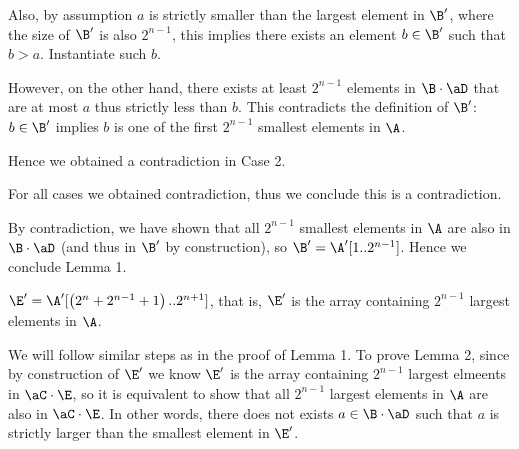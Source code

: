 \documentclass[11pt, sakura, night, 1in]{hw}
\begin{document}
{{{{\begin{proofcases}
{                        Also, by assumption $a$ is strictly smaller than the largest element in $\B'$, where the size of $\B'$ is also $2^{n-1}$, this implies there exists an element $b\in\B'$ such that $b>a$. Instantiate such $b$.

                        However, on the other hand, there exists at least $2^{n-1}$ elements in $\B\cd\aD$ that are at most $a$ thus strictly less than $b$. This contradicts the definition of $\B'$: $b\in\B'$ implies $b$ is one of the first $2^{n-1}$ smallest elements in $\A$.
                    }
                    Hence we obtained a contradiction in Case 2.
                \end{proofcases}

                For all cases we obtained contradiction, thus we conclude this is a contradiction.
            }

            By contradiction, we have shown that all $2^{n-1}$ smallest elements in $\A$ are also in $\B\cd\aD$ (and thus in $\B'$ by construction), so $\B'=\A'[1..2^{n-1}]$. Hence we conclude Lemma 1.
            
             $\E'=\A'[\bra{2^n+2^{n-1}+1}..2^{n+1}]$, that is, $\E'$ is the array containing $2^{n-1}$ largest elements in $\A$.


            We will follow similar steps as in the proof of Lemma 1. To prove Lemma 2, since by construction of $\E'$ we know $\E'$ is the array containing $2^{n-1}$ largest elmeents in $\aC\cd\E$, so it is equivalent to show that all $2^{n-1}$ largest elements in $\A$ are also in $\aC\cd\E$. In other words, there does not exists $a\in\B\cd\aD$ such that $a$ is strictly larger than the smallest element in $\E'$.

            }}}
\end{document}
